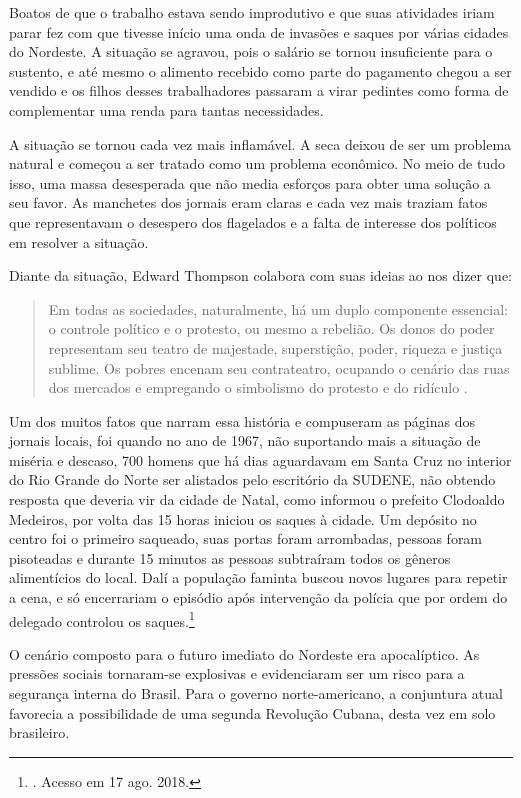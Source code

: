 \begin{refsection}
    Boatos de que o trabalho estava sendo improdutivo e que suas atividades iriam parar fez com que tivesse início uma onda de invasões e saques por várias cidades do Nordeste. A situação se agravou, pois o salário se tornou insuficiente para o sustento, e até mesmo o alimento recebido como parte do pagamento chegou a ser vendido e os filhos desses trabalhadores passaram a virar pedintes como forma de complementar uma renda para tantas necessidades. 

    A situação se tornou cada vez mais inflamável. A seca deixou de ser um problema natural e começou a ser tratado como um problema econômico. No meio de tudo isso, uma massa desesperada que não media esforços para obter uma solução a seu favor. As manchetes dos jornais eram claras e cada vez mais traziam fatos que representavam o desespero dos flagelados e a falta de interesse dos políticos em resolver a situação. 

    Diante da situação, Edward Thompson colabora com suas ideias ao nos dizer que:

    \begin{quotation}
        Em todas as sociedades, naturalmente, há um duplo componente essencial: o controle político e o protesto, ou mesmo a rebelião. Os donos do poder representam seu teatro de majestade, superstição, poder, riqueza e justiça sublime. Os pobres encenam seu contrateatro, ocupando o cenário das ruas dos mercados e empregando o simbolismo do protesto e do ridículo \cite[p.~239--234]{Thompson2001Historia}.
    \end{quotation}

    Um dos muitos fatos que narram essa história e compuseram as páginas dos jornais locais, foi quando no ano de 1967, não suportando mais a situação de miséria e descaso, 700 homens que há dias aguardavam em Santa Cruz no interior do Rio Grande do Norte ser alistados pelo escritório da SUDENE, não obtendo resposta que deveria vir da cidade de Natal, como informou o prefeito Clodoaldo Medeiros, por volta das 15 horas iniciou os saques à cidade. Um depósito no centro foi o primeiro saqueado, suas portas foram arrombadas, pessoas foram pisoteadas e durante 15 minutos as pessoas subtraíram todos os gêneros alimentícios do local. Dalí a população faminta buscou novos lugares para repetir a cena, e só encerrariam o episódio após intervenção da polícia que por ordem do delegado controlou os saques.\footnote{. Acesso em 17 ago. 2018.}

    O cenário composto para o futuro imediato do Nordeste era apocalíptico. As pressões sociais tornaram-se explosivas e evidenciaram ser um risco para a segurança interna do Brasil. Para o governo norte-americano, a conjuntura atual favorecia a possibilidade de uma segunda Revolução Cubana, desta vez em solo brasileiro. 


\end{refsection}
